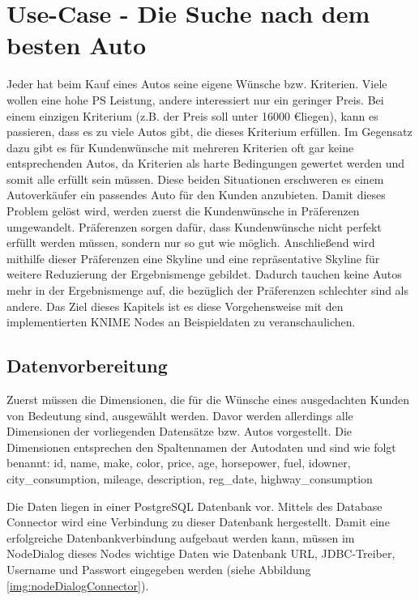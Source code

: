 \chapter{Use-Case - Die Suche nach dem besten Auto}
\label{ch:useCase}
Jeder hat beim Kauf eines Autos seine eigene Wünsche bzw. Kriterien. Viele wollen eine hohe PS Leistung, andere interessiert nur ein geringer Preis. Bei einem einzigen Kriterium (z.B. der Preis soll unter 16000 \euro liegen), kann es passieren, dass es zu viele Autos gibt, die dieses Kriterium erfüllen.
Im Gegensatz dazu gibt es für Kundenwünsche mit mehreren Kriterien oft gar keine entsprechenden Autos, da Kriterien als harte Bedingungen gewertet werden und somit alle erfüllt sein müssen. Diese beiden Situationen erschweren es einem Autoverkäufer ein passendes Auto für den Kunden anzubieten. Damit dieses Problem gelöst wird, werden zuerst die Kundenwünsche in Präferenzen umgewandelt. Präferenzen sorgen dafür, dass Kundenwünsche nicht perfekt erfüllt werden müssen, sondern nur so gut wie möglich. Anschließend wird mithilfe dieser Präferenzen eine Skyline und eine repräsentative Skyline für weitere Reduzierung der Ergebnismenge gebildet. Dadurch tauchen keine Autos mehr in der Ergebnismenge auf, die bezüglich der Präferenzen schlechter sind als andere.
Das Ziel dieses Kapitels ist es diese Vorgehensweise mit den implementierten KNIME Nodes an Beispieldaten zu veranschaulichen.
\section{Datenvorbereitung}
\label{ch:Evaluierung:sec:vorbereitung}
Zuerst müssen die Dimensionen, die für die Wünsche eines ausgedachten Kunden von Bedeutung sind, ausgewählt werden. Davor werden allerdings alle Dimensionen der vorliegenden Datensätze bzw. Autos vorgestellt. Die Dimensionen entsprechen den Spaltennamen der Autodaten und sind wie folgt benannt: id, name, make, color, price, age, horsepower, fuel, idowner, city_consumption, mileage, description, reg_date, highway_consumption

Die Daten liegen in einer PostgreSQL Datenbank vor. Mittels des Database Connector wird eine Verbindung zu dieser Datenbank hergestellt. Damit eine erfolgreiche Datenbankverbindung aufgebaut werden kann, müssen im NodeDialog dieses Nodes wichtige Daten wie Datenbank URL, JDBC-Treiber, Username und Passwort eingegeben werden (siehe Abbildung \ref{img:nodeDialogConnector}). 

